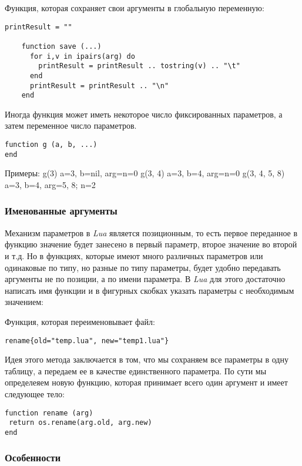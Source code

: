 Функция, которая сохраняет свои аргументы в глобальную переменную:
\begin{lstlisting}
printResult = ""
    
    function save (...)
      for i,v in ipairs(arg) do
        printResult = printResult .. tostring(v) .. "\t"
      end
      printResult = printResult .. "\n"
    end
\end{lstlisting} 

Иногда функция может иметь некоторое число фиксированных параметров, а затем переменное число параметров. 

\begin{lstlisting}
function g (a, b, ...)
end
\end{lstlisting}

Примеры:      
\newline g(3) a=3, b=nil, arg={n=0}
\newline g(3, 4) a=3, b=4, arg={n=0}
\newline g(3, 4, 5, 8) a=3, b=4, arg={5, 8; n=2}


\subsubsection{Именованные аргументы}
Механизм параметров в \emph{Lua} является позиционным, то есть первое переданное в функцию значение будет занесено в первый параметр, второе значение во второй и т.д. Но в функциях, которые имеют много различных параметров или одинаковые по типу, но разные по типу параметры, будет удобно передавать аргументы не по позиции, а по имени параметра. В \emph{Lua} для этого достаточно написать имя функции и в фигурных скобках указать параметры с необходимым значением: 

Функция, которая переименовывает файл:
\begin{lstlisting}
rename{old="temp.lua", new="temp1.lua"}
\end{lstlisting}

Идея этого метода заключается в том, что мы сохраняем все параметры в одну таблицу, а передаем ее в качестве единственного параметра. По сути мы определеяем новую функцию, которая принимает всего один аргумент и имеет следующее тело:

\begin{lstlisting}
function rename (arg)
 return os.rename(arg.old, arg.new)
end
\end{lstlisting}

\subsubsection{Особенности}


